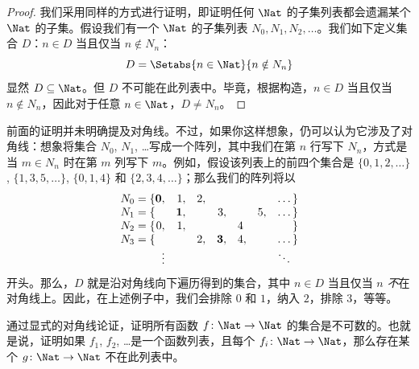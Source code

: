 \documentclass[../../../include/open-logic-section]{subfiles}
\begin{document}
\begin{proof}
我们采用同样的方式进行证明，即证明任何 $\Nat$ 的子集列表都会遗漏某个 $\Nat$ 的子集。假设我们有一个 $\Nat$ 的子集列表 $N_0, N_1, N_2, \ldots$。我们如下定义集合 $D$：$n \in D$ 当且仅当 $n \notin N_{n}$：
\[
D = \Setabs{n \in \Nat}{n \notin N_n}
\]
显然 $D\subseteq \Nat$。但 $D$ 不可能在此列表中。毕竟，根据构造，$n \in D$ 当且仅当 $n\notin N_n$，因此对于任意 $n \in \Nat$，$D \neq N_n$。
\end{proof}

\begin{explain}
前面的证明并未明确提及对角线。不过，如果你这样想象，仍可以认为它涉及了对角线：想象将集合 $N_0$, $N_1$, \dots 写成一个阵列，其中我们在第 $n$ 行写下 $N_n$，方式是当 $m \in N_n$ 时在第 $m$ 列写下 $m$。例如，假设该列表上的前四个集合是 $\{0,1,2,\dots\}$, $\{1, 3, 5, \dots\}$, $\{0,1,4\}$ 和 $\{2,3,4,\dots\}$；那么我们的阵列将以
\[
\begin{array}{r@{}rrrrrrr}
  N_0 = \{ & \mathbf{0}, & 1, & 2, & & & & \dots\}\\
  N_1 = \{ &  & \mathbf{1}, &  & 3, &  & 5, & \dots\}\\
  N_2 = \{ & 0, & 1, &  &  & 4\phantom{,} &  & \}\\
  N_3 = \{ &  &  & 2, & \mathbf{3}, & 4, & & \dots\}\\
  &\vdots & & & & & & \ddots\phantom{\}}
  \end{array}
\]
开头。那么，$D$ 就是沿对角线向下遍历得到的集合，其中 $n \in D$ 当且仅当 $n$ \emph{不}在对角线上。因此，在上述例子中，我们会排除 $0$ 和 $1$，纳入 $2$，排除 $3$，等等。
\end{explain}

\begin{prob}
通过显式的对角线论证，证明所有函数 $f \colon \Nat \to \Nat$ 的集合是不可数的。也就是说，证明如果 $f_1$, $f_2$, \dots 是一个函数列表，且每个 $f_i\colon \Nat \to \Nat$，那么存在某个 $g \colon \Nat \to \Nat$ 不在此列表中。
\end{prob}
\end{document}
